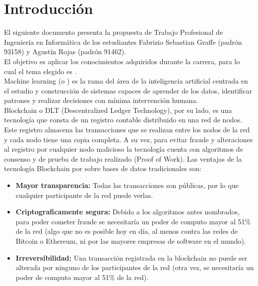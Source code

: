 \documentclass[
11pt, %
oneside, %
spanish, %
singlespacing, %
headsepline, %
chapterinoneline, %
]{MastersDoctoralThesis} %
\begin{document}

\tableofcontents %


\mainmatter %

\pagestyle{thesis} %

\chapter{Introducci\'on}
El siguiente documento presenta la propuesta de Trabajo Profesional de Ingeniería en Informática de los estudiantes Fabrizio Sebastian Graffe (padrón 93158) y Agustín Rojas (padrón 91462). \\

El objetivo es aplicar los conocimientos adquiridos durante la carrera, para lo cual el tema elegido es \textbf{ }. \\

Machine learning (o ) es la rama del área de la inteligencia artificial centrada en el estudio y construcción de sistemas capaces de aprender de los datos, identificar patrones y realizar decisiones con mínima intervención humana. \\

Blockchain \cite{bc} o DLT (Descentralized Ledger Technology), por su lado, es una tecnología que consta de un registro contable distribuido en una red de nodos. Este registro almacena las transacciones que se realizan entre los nodos de la red y cada nodo tiene una copia completa. A su vez, para evitar fraude y alteraciones al registro por cualquier nodo malicioso la tecnología cuenta con algoritmos de consenso y de prueba de trabajo realizado (Proof of Work).
Las ventajas de la tecnología Blockchain por sobre bases de datos tradicionales son:
\begin{itemize}
\item \textbf{Mayor transparencia:} Todas las transacciones son públicas, por lo que cualquier participante de la red puede verlas.
\item \textbf{Criptograficamente segura:} Debido a los algoritmos antes nombrados, para poder cometer fraude se necesitaría un poder de computo mayor al 51\% de la red (algo que no es posible hoy en día, al menos contra las redes de Bitcoin o Ethereum, ni por las mayores empresas de software en el mundo).
\item \textbf{Irreversibilidad:} Una transacción registrada en la blockchain no puede ser alterada por ninguno de los participantes de la red (otra vez, se necesitaría un poder de computo mayor al 51\% de la red).
\end{itemize}
\end{document}
